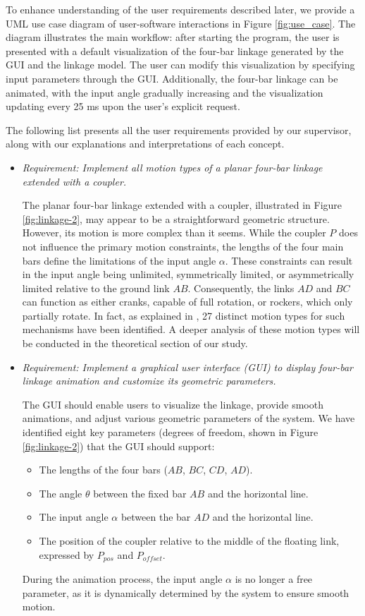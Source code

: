 \documentclass{article}
\begin{document}
To enhance understanding of the user requirements described later, we provide a UML use case diagram of user-software interactions in Figure \ref{fig:use_case}. The diagram illustrates the main workflow: after starting the program, the user is presented with a default visualization of the four-bar linkage generated by the GUI and the linkage model. The user can modify this visualization by specifying input parameters through the GUI. Additionally, the four-bar linkage can be animated, with the input angle gradually increasing and the visualization updating every 25 ms upon the user’s explicit request.

The following list presents all the user requirements provided by our supervisor, along with our explanations and interpretations of each concept.

\begin{itemize}
	\item \textit{Requirement: Implement all motion types of a planar four-bar linkage extended with a coupler.}
	
	The planar four-bar linkage extended with a coupler, illustrated in Figure \ref{fig:linkage-2}, may appear to be a straightforward geometric structure. However, its motion is more complex than it seems. While the coupler $P$ does not influence the primary motion constraints, the lengths of the four main bars define the limitations of the input angle $\alpha$. These constraints can result in the input angle being unlimited, symmetrically limited, or asymmetrically limited relative to the ground link $AB$. Consequently, the links $AD$ and $BC$ can function as either cranks, capable of full rotation, or rockers, which only partially rotate. In fact, as explained in \cite{inproceedings}, 27 distinct motion types for such mechanisms have been identified. A deeper analysis of these motion types will be conducted in the theoretical section of our study.
	
	\item \textit{Requirement: Implement a graphical user interface (GUI) to display four-bar linkage animation and customize its geometric parameters.}
	
	The GUI should enable users to visualize the linkage, provide smooth animations, and adjust various geometric parameters of the system. We have identified eight key parameters (degrees of freedom, shown in Figure \ref{fig:linkage-2}) that the GUI should support:
	\begin{itemize}
		\item The lengths of the four bars ($AB$, $BC$, $CD$, $AD$).
		\item The angle $\theta$ between the fixed bar $AB$ and the horizontal line.
		\item The input angle $\alpha$ between the bar $AD$ and the horizontal line.
		\item The position of the coupler relative to the middle of the floating link, expressed by $P_{pos}$ and $P_{offset}$.
	\end{itemize}
	During the animation process, the input angle $\alpha$ is no longer a free parameter, as it is dynamically determined by the system to ensure smooth motion.
	

\end{itemize}
\end{document}
